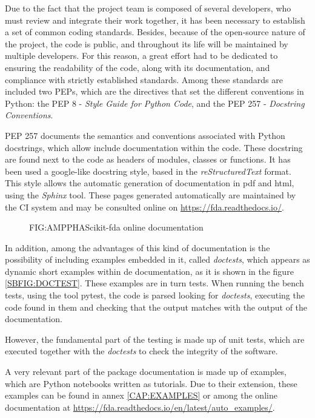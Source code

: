 

Due to the fact that the project team is composed of several developers, who
must review and integrate their work together, it has been necessary to
establish a set of common coding standards.
Besides, because of the open-source nature of the project, the code is
public, and throughout its life will be maintained by multiple developers. For
this reason, a great effort had to be dedicated to ensuring the readability of
the code, along with its documentation, and compliance with strictly established
standards. Among these standards are included two \ac{PEPs}, which are the directives that set the different conventions in Python:
the \acs{PEP} 8 - \textit{Style Guide for Python Code}, and the \acs{PEP} 257 - \textit{Docstring Conventions}.

\acs{PEP} 257 documents the semantics and conventions associated with Python
docstrings, which allow include documentation within the code. These docstring
are found next to the code as headers of modules, classes or functions. It has
been used a google-like docstring style, based in the \textit{reStructuredText} format.
This style allows the automatic generation of documentation in pdf and html,
using the \textit{Sphinx} tool. These pages generated automatically are maintained by
the \ac{CI} system and may be consulted online on
\href{https://fda.readthedocs.io/}{https://fda.readthedocs.io/}.

\begin{figure}[Scikit-fda online documentation]{FIG:AMPPHA}{Scikit-fda online documentation}
   \quad
\end{figure}

In addition, among the advantages of this kind of documentation is the
possibility of including examples embedded in it, called \textit{doctests}, which appears
 as dynamic short examples within de documentation, as it is shown in the
 figure \ref{SBFIG:DOCTEST}.
These examples are in turn tests. When running the bench tests, using the tool
pytest, the code is parsed looking for \textit{doctests}, executing the code found in
them and checking that the output matches with the output of the documentation.

However, the fundamental part of the testing is made up of unit tests, which are
executed together with the \textit{doctests} to check the integrity of the software.

A very relevant part of the package documentation is made up of examples,
which are Python notebooks written as tutorials. Due to their extension, these
examples can be found in annex \ref{CAP:EXAMPLES} or among the online documentation
at \href{https://fda.readthedocs.io/en/latest/auto_examples/}{https://fda.readthedocs.io/en/latest/auto_examples/}.
